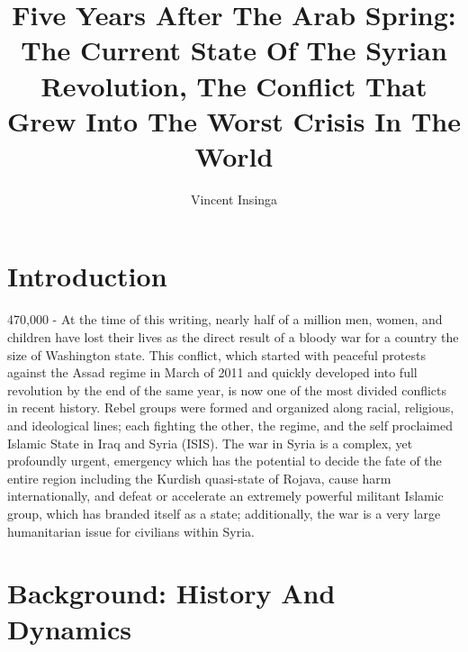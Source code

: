 \documentclass[a4paper,titlepage,12pt]{turabian-researchpaper}
\begin{document}
\title{Five Years After The Arab Spring: The Current State Of The Syrian
	Revolution, The Conflict That Grew Into The Worst Crisis In
	The World}
\author{Vincent Insinga}

\maketitle

\section{Introduction}

470,000 - At the time of this writing, nearly half of a million men, women, and
children have lost their lives as the direct result of a bloody war for a
country the size of Washington state. \autocite{death}
This conflict, which started with peaceful protests against the Assad regime in
March of 2011 and quickly developed into full revolution by the
end of the same year, is now one of the most divided conflicts in recent
history. Rebel groups were formed and organized along racial, religious, and ideological
lines; each fighting the other, the regime, and the self proclaimed Islamic
State in Iraq and Syria (ISIS). \autocite[2-5]{sectarian} The war in
Syria is a complex, yet profoundly urgent, emergency which  has the potential to decide the fate of
the entire region including the Kurdish quasi-state of  Rojava,
cause harm internationally, and defeat or accelerate an extremely powerful
militant Islamic group, which has branded itself as a state; additionally, the
war is a very large humanitarian issue for civilians within Syria.

\section{Background: History And Dynamics}
\end{document}
